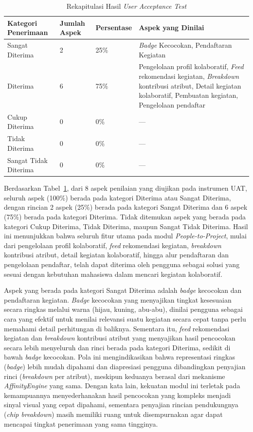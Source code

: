 \begin{table}[H]
  \caption{Rekapitulasi Hasil \emph{User Acceptance Test}}
  \label{tab:hasil-uat}
  \begin{tabularx}{\textwidth}{p{3.5cm} p{1.5cm} p{1.5cm} X}
    \toprule
    \textbf{Kategori Penerimaan} & \textbf{Jumlah Aspek} & \textbf{Persentase} & \textbf{Aspek yang Dinilai} \\
    \midrule
    Sangat Diterima & 2 & 25\% & \emph{Badge} Kecocokan, Pendaftaran Kegiatan \\
    \midrule
    Diterima & 6 & 75\% & Pengelolaan profil kolaboratif, \emph{Feed} rekomendasi kegiatan, \emph{Breakdown} kontribusi atribut, Detail kegiatan kolaboratif, Pembuatan kegiatan, Pengelolaan pendaftar \\
    \midrule
    Cukup Diterima & 0 & 0\% & --- \\
    \midrule
    Tidak Diterima & 0 & 0\% & --- \\
    \midrule
    Sangat Tidak Diterima & 0 & 0\% & --- \\
    \bottomrule
  \end{tabularx}
\end{table}

Berdasarkan Tabel~\ref{tab:hasil-uat}, dari 8 aspek penilaian yang diujikan pada instrumen UAT, seluruh aspek (100\%) berada pada kategori Diterima atau Sangat Diterima, dengan rincian 2 aspek (25\%) berada pada kategori Sangat Diterima dan 6 aspek (75\%) berada pada kategori Diterima. Tidak ditemukan aspek yang berada pada kategori Cukup Diterima, Tidak Diterima, maupun Sangat Tidak Diterima. Hasil ini menunjukkan bahwa seluruh fitur utama pada modul \emph{People-to-Project}, mulai dari pengelolaan profil kolaboratif, \emph{feed} rekomendasi kegiatan, \emph{breakdown} kontribusi atribut, detail kegiatan kolaboratif, hingga alur pendaftaran dan pengelolaan pendaftar, telah dapat diterima oleh pengguna sebagai solusi yang sesuai dengan kebutuhan mahasiswa dalam mencari kegiatan kolaboratif.

Aspek yang berada pada kategori Sangat Diterima adalah \emph{badge} kecocokan dan pendaftaran kegiatan. \emph{Badge} kecocokan yang menyajikan tingkat kesesuaian secara ringkas melalui warna (hijau, kuning, abu-abu), dinilai pengguna sebagai cara yang efektif untuk menilai relevansi suatu kegiatan secara cepat tanpa perlu memahami detail perhitungan di baliknya. Sementara itu, \emph{feed} rekomendasi kegiatan dan \emph{breakdown} kontribusi atribut yang menyajikan hasil pencocokan secara lebih menyeluruh dan rinci berada pada kategori Diterima, sedikit di bawah \emph{badge} kecocokan. Pola ini mengindikasikan bahwa representasi ringkas (\emph{badge}) lebih mudah dipahami dan diapresiasi pengguna dibandingkan penyajian rinci (\emph{breakdown} per atribut), meskipun keduanya berasal dari mekanisme \emph{AffinityEngine} yang sama. Dengan kata lain, kekuatan modul ini terletak pada kemampuannya menyederhanakan hasil pencocokan yang kompleks menjadi sinyal visual yang cepat dipahami, sementara penyajian rincian pendukungnya (\emph{chip breakdown}) masih memiliki ruang untuk disempurnakan agar dapat mencapai tingkat penerimaan yang sama tingginya.

